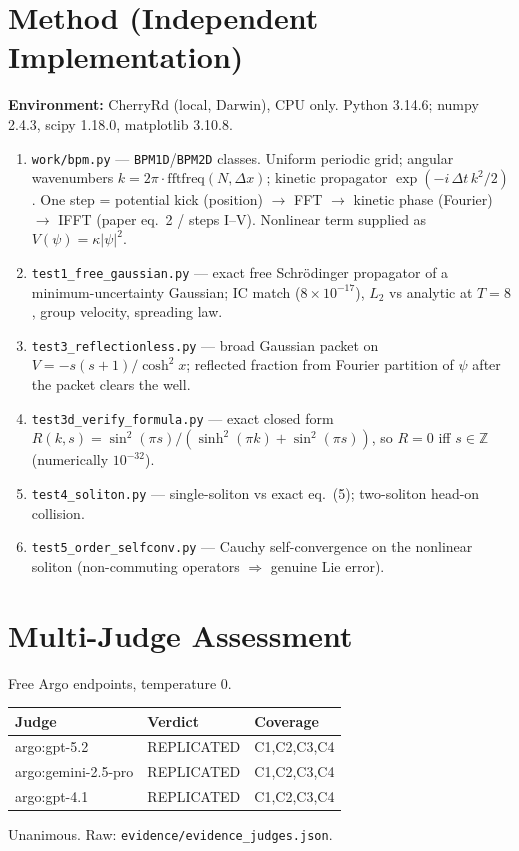 \documentclass[11pt]{article}
\begin{document}
\section{Method (Independent Implementation)}
\textbf{Environment:} CherryRd (local, Darwin), CPU only. Python 3.14.6;
numpy 2.4.3, scipy 1.18.0, matplotlib 3.10.8.
\begin{enumerate}
\item \texttt{work/bpm.py} --- \texttt{BPM1D}/\texttt{BPM2D} classes.
Uniform periodic grid; angular wavenumbers $k=2\pi\cdot\text{fftfreq}(N,\Delta x)$;
kinetic propagator $\exp(-i\,\Delta t\,k^2/2)$. One step = potential kick
(position) $\to$ FFT $\to$ kinetic phase (Fourier) $\to$ IFFT (paper
eq.~2 / steps I--V). Nonlinear term supplied as $V(\psi)=\kappa|\psi|^2$.
\item \texttt{test1\_free\_gaussian.py} --- exact free Schr\"odinger
propagator of a minimum-uncertainty Gaussian; IC match ($8\times10^{-17}$),
$L_2$ vs analytic at $T=8$, group velocity, spreading law.
\item \texttt{test3\_reflectionless.py} --- broad Gaussian packet
on $V=-s(s{+}1)/\cosh^2 x$; reflected fraction from Fourier partition of
$\psi$ after the packet clears the well.
\item \texttt{test3d\_verify\_formula.py} --- exact closed form
$R(k,s)=\sin^2(\pi s)/(\sinh^2(\pi k)+\sin^2(\pi s))$, so $R=0$ iff
$s\in\mathbb{Z}$ (numerically $10^{-32}$).
\item \texttt{test4\_soliton.py} --- single-soliton vs exact eq.~(5); two-soliton
head-on collision.
\item \texttt{test5\_order\_selfconv.py} --- Cauchy self-convergence on the
nonlinear soliton (non-commuting operators $\Rightarrow$ genuine Lie error).
\end{enumerate}

\section{Multi-Judge Assessment}
Free Argo endpoints, temperature 0.
\begin{table}[h]
\centering\small
\begin{tabular}{@{}lll@{}}
\toprule
Judge & Verdict & Coverage \\
\midrule
argo:gpt-5.2 & REPLICATED & C1,C2,C3,C4 \\
argo:gemini-2.5-pro & REPLICATED & C1,C2,C3,C4 \\
argo:gpt-4.1 & REPLICATED & C1,C2,C3,C4 \\
\bottomrule
\end{tabular}
\end{table}
Unanimous. Raw: \texttt{evidence/evidence\_judges.json}.
\end{document}
